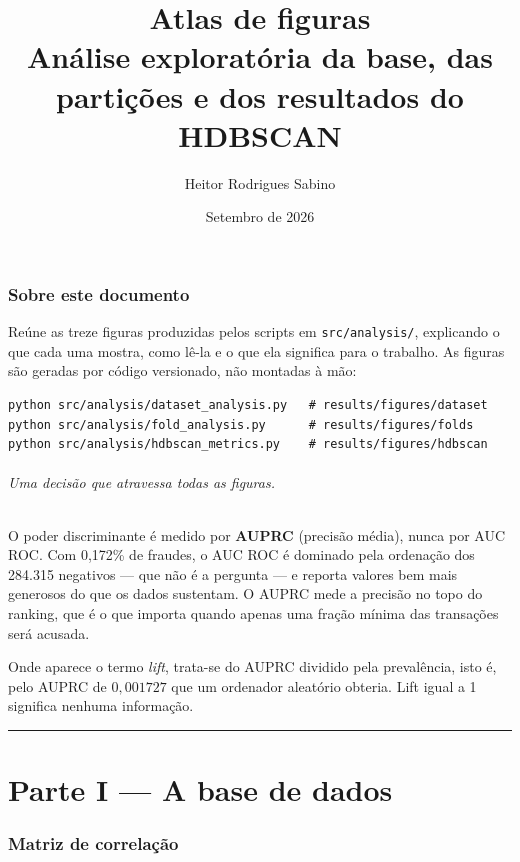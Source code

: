 \documentclass[11pt,a4paper]{article}
\title{\textbf{Atlas de figuras}\\[0.3em]
\large Análise exploratória da base, das partições e dos resultados do HDBSCAN}
\author{Heitor Rodrigues Sabino}
\date{Setembro de 2026}
\begin{document}
\maketitle

\section*{Sobre este documento}

Reúne as treze figuras produzidas pelos scripts em \texttt{src/analysis/},
explicando o que cada uma mostra, como lê-la e o que ela significa para o
trabalho. As figuras são geradas por código versionado, não montadas à mão:

\begin{verbatim}
python src/analysis/dataset_analysis.py   # results/figures/dataset
python src/analysis/fold_analysis.py      # results/figures/folds
python src/analysis/hdbscan_metrics.py    # results/figures/hdbscan
\end{verbatim}

\paragraph{Uma decisão que atravessa todas as figuras.}
O poder discriminante é medido por \textbf{AUPRC} (precisão média), nunca por
AUC ROC. Com 0,172\% de fraudes, o AUC ROC é dominado pela ordenação dos
284.315 negativos --- que não é a pergunta --- e reporta valores bem mais
generosos do que os dados sustentam. O AUPRC mede a precisão no topo do
ranking, que é o que importa quando apenas uma fração mínima das transações
será acusada.

Onde aparece o termo \emph{lift}, trata-se do AUPRC dividido pela prevalência,
isto é, pelo AUPRC de $0{,}001727$ que um ordenador aleatório obteria. Lift
igual a 1 significa nenhuma informação.

\vspace{1em}
\hrule
\vspace{1em}

\part*{Parte I --- A base de dados}

\section{Matriz de correlação}
\end{document}
